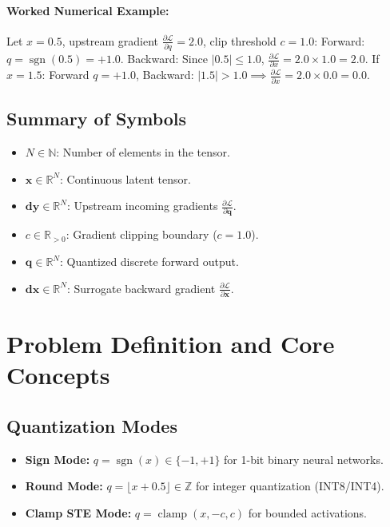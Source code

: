 \documentclass[11pt]{article}
\begin{document}
\paragraph{Worked Numerical Example:}
Let $x = 0.5$, upstream gradient $\frac{\partial \mathcal{L}}{\partial q} = 2.0$, clip threshold $c = 1.0$:
Forward: $q = \operatorname{sgn}(0.5) = +1.0$.
Backward: Since $|0.5| \le 1.0$, $\frac{\partial \mathcal{L}}{\partial x} = 2.0 \times 1.0 = 2.0$.
If $x = 1.5$: Forward $q = +1.0$, Backward: $|1.5| > 1.0 \implies \frac{\partial \mathcal{L}}{\partial x} = 2.0 \times 0.0 = 0.0$.

\subsection{Summary of Symbols}
\begin{itemize}
    \item $N \in \mathbb{N}$: Number of elements in the tensor.
    \item $\mathbf{x} \in \mathbb{R}^N$: Continuous latent tensor.
    \item $\mathbf{dy} \in \mathbb{R}^N$: Upstream incoming gradients $\frac{\partial \mathcal{L}}{\partial \mathbf{q}}$.
    \item $c \in \mathbb{R}_{>0}$: Gradient clipping boundary ($c = 1.0$).
    \item $\mathbf{q} \in \mathbb{R}^N$: Quantized discrete forward output.
    \item $\mathbf{dx} \in \mathbb{R}^N$: Surrogate backward gradient $\frac{\partial \mathcal{L}}{\partial \mathbf{x}}$.
\end{itemize}

\section{Problem Definition and Core Concepts}
\label{sec:problem_definition}

\subsection{Quantization Modes}
\begin{itemize}
    \item \textbf{Sign Mode:} $q = \operatorname{sgn}(x) \in \{-1, +1\}$ for 1-bit binary neural networks.
    \item \textbf{Round Mode:} $q = \lfloor x + 0.5 \rfloor \in \mathbb{Z}$ for integer quantization (INT8/INT4).
    \item \textbf{Clamp STE Mode:} $q = \operatorname{clamp}(x, -c, c)$ for bounded activations.
\end{itemize}
\end{document}
